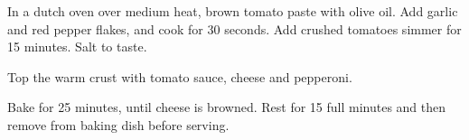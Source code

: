 \begin{recipe}
In a dutch oven over medium heat, brown tomato paste with olive oil. Add garlic and red pepper flakes, and cook for 30 seconds. Add crushed tomatoes simmer for 15 minutes. Salt to taste.


Top the warm crust with tomato sauce, cheese and pepperoni.

Bake for 25 minutes, until cheese is browned. Rest for 15 full minutes and then remove from baking dish before serving.

\end{recipe}
